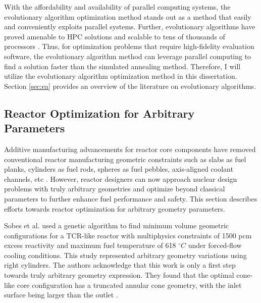 With the affordability and availability of parallel computing systems, the 
evolutionary algorithm optimization method stands out as a method 
that easily and conveniently exploits parallel systems. 
Further, evolutionary algorithms have proved amenable to \gls{HPC} solutions and 
scalable to tens of thousands of processors \cite{kropaczek_constraint_2019}. 
Thus, for optimization problems that require high-fidelity evaluation software, 
the evolutionary algorithm method can leverage parallel computing to find a 
solution faster than the simulated annealing method.
Therefore, I will utilize the evolutionary algorithm optimization method in 
this dissertation.
Section \ref{sec:ea} provides an overview of the literature on evolutionary algorithms.

\subsection{Reactor Optimization for Arbitrary Parameters}
\label{sec:lit-review-reactor-arbitrary}
Additive manufacturing advancements for reactor core components have
removed conventional reactor manufacturing geometric constraints such as slabs as fuel 
planks, cylinders as fuel rods, spheres as fuel pebbles, axis-aligned coolant 
channels, etc \cite{sobes_artificial_2020}.
However, reactor designers can now approach nuclear design problems with truly 
arbitrary geometries and optimize beyond classical parameters to further enhance 
fuel performance and safety.
This section describes efforts towards reactor optimization for arbitrary geometry 
parameters. 

Sobes et al. \cite{sobes_artificial_2020} used a genetic algorithm to find 
minimum volume geometric configurations for a \gls{TCR}-like reactor with 
multiphysics constraints of 1500 pcm excess reactivity and maximum fuel 
temperature of 618 $^{\circ}C$ under forced-flow cooling conditions. 
This study represented arbitrary geometry variations using right cylinders.
The authors acknowledge that this work is only a first step towards truly 
arbitrary geometry expression. 
They found that the optimal cone-like core configuration has a truncated annular 
cone geometry, with the inlet surface being larger than the outlet 
\cite{sobes_artificial_2020}.


